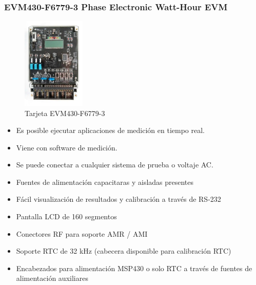 \subsubsection{EVM430-F6779-3 Phase Electronic Watt-Hour EVM}
\begin{figure}
\centering
\includegraphics[width = 3cm]{3Proyecto/EVM430-F6779}
\caption{Tarjeta EVM430-F6779-3} 
\label{fig:EVM430-F6779-3}
\end{figure} 
\begin{itemize}
\itemsep0em
\item Es posible ejecutar aplicaciones de medición en tiempo real.
\item Viene con software de medición.
\item Se puede conectar a cualquier sistema de prueba o voltaje AC.
\item Fuentes de alimentación capacitaras y aisladas presentes
\item Fácil visualización de resultados y calibración a través de RS-232
\item Pantalla LCD de 160 segmentos
\item Conectores RF para soporte AMR / AMI
\item Soporte RTC de 32 kHz (cabecera disponible para calibración RTC)
\item Encabezados para alimentación MSP430 o solo  RTC a través de fuentes de alimentación auxiliares
\end{itemize}
